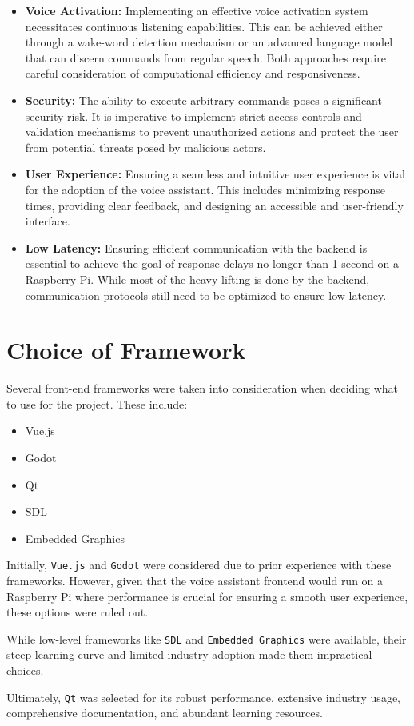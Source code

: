 \begin{itemize}
    \item \textbf{Voice Activation:} Implementing an effective voice activation system necessitates
    continuous listening capabilities. This can be achieved either through a wake-word detection
    mechanism or an advanced language model that can discern commands from regular speech.
    Both approaches require careful consideration of computational efficiency and responsiveness.

    \item \textbf{Security:} The ability to execute arbitrary commands poses a significant security
    risk. It is imperative to implement strict access controls and validation mechanisms to prevent
    unauthorized actions and protect the user from potential threats posed by malicious actors.

    \item \textbf{User Experience:} Ensuring a seamless and intuitive user experience is vital for
    the adoption of the voice assistant. This includes minimizing response times, providing clear
    feedback, and designing an accessible and user-friendly interface.

    \item \textbf{Low Latency:} Ensuring efficient communication with
    the backend is essential to achieve the goal of response delays no longer than 1 second on a Raspberry Pi.
    While most of the heavy lifting is done by the backend, communication protocols still need to be optimized
    to ensure low latency.
\end{itemize}

\section{Choice of Framework}
Several front-end frameworks were taken into consideration when deciding what to use for the project. These include:

\begin{itemize}
    \item Vue.js
    \item Godot
    \item Qt
    \item SDL
    \item Embedded Graphics
\end{itemize}

Initially, \texttt{Vue.js} and \texttt{Godot} were considered due to prior experience with these frameworks.
However, given that the voice assistant frontend would run on a Raspberry Pi where performance is crucial
for ensuring a smooth user experience, these options were ruled out.

While low-level frameworks like \texttt{SDL} and \texttt{Embedded Graphics} were available,
their steep learning curve and limited industry adoption made them impractical choices.

Ultimately, \texttt{Qt} was selected for its robust performance, extensive industry usage,
comprehensive documentation, and abundant learning resources.
